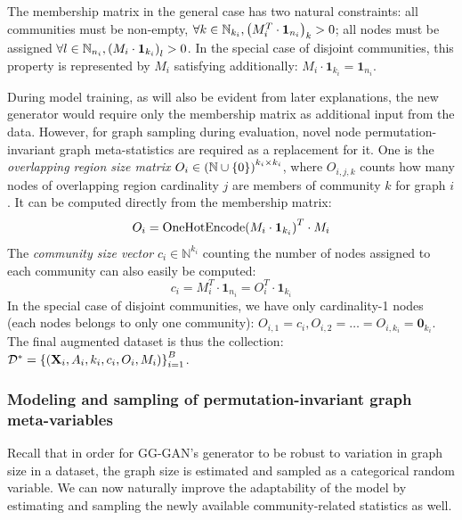The membership matrix in the general case has two natural constraints: all communities must be non-empty, $\forall k \in \mathbb{N}_{k_i}, \mathopen{}\left(M^T_i \cdot \mathbf{1}_{n_i}\right)_k > 0$; all nodes must be assigned $\forall l \in \mathbb{N}_{n_i}, \mathopen{}\left(M_i \cdot \mathbf{1}_{k_i}\right)_l > 0$. In the special case of disjoint communities, this property is represented by $M_i$ satisfying additionally: $M_i \cdot \mathbf{1}_{k_i} = \mathbf{1}_{n_i}$.

During model training, as will also be evident from later explanations, the new generator would require only the membership matrix as additional input from the data. However, for graph sampling during evaluation, novel node permutation-invariant graph meta-statistics are required as a replacement for it. One is the \emph{overlapping region size matrix} $O_i \in \mathopen{}\left(\mathbb{N}\cup\mathopen{}\left\{0\right\}\right)^{k_i \times k_i}$, where $O_{i,j,k}$ counts how many nodes of overlapping region cardinality $j$ are members of community $k$ for graph $i$. It can be computed directly from the membership matrix:
\begin{equation}
O_i = \text{OneHotEncode}\mathopen{}\left(M_i \cdot \mathbf{1}_{k_i}\right)^T \cdot M_i
\end{equation}
The \emph{community size vector} $c_i \in \mathbb{N}^{k_i}$ counting the number of nodes assigned to each community can also easily be computed: 
\begin{equation}
c_i = M^T_i \cdot \mathbf{1}_{n_i} = O_i^T \cdot \mathbf{1}_{k_i}
\end{equation}
In the special case of disjoint communities, we have only cardinality-1 nodes (each nodes belongs to only one community): $O_{i,1}=c_i, O_{i,2}=\dots=O_{i,k_i}=\mathbf{0}_{k_i}$.
The final augmented dataset is thus the collection: $\mathcal{D}^* = \mathopen{}\left\{\mathopen{}\left(\mathbf{X}_i, A_i, k_i, c_i, O_i, M_i\right)\right\}_{i=1}^{B}$.

\subsubsection{Modeling and sampling of permutation-invariant graph meta-variables}
Recall that in order for GG-GAN's generator to be robust to variation in graph size in a dataset, the graph size is estimated and sampled as a categorical random variable. We can now naturally improve the adaptability of the model by estimating and sampling the newly available community-related statistics as well.

